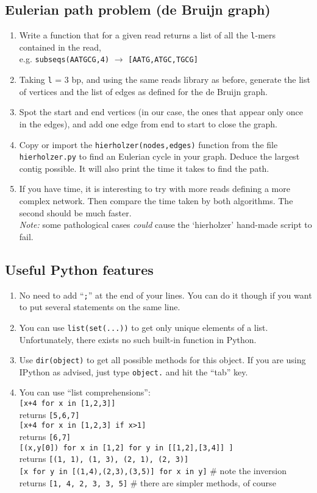 \documentclass[a4paper,11pt]{article}
\begin{document}
\subsection{Eulerian path problem (de Bruijn graph)}
\begin{enumerate}
\item Write a function that for a given read returns a list of all the \texttt{l}-mers contained in the read, \\
e.g. \texttt{subseqs(AATGCG,4)} $\rightarrow$  \texttt{[AATG,ATGC,TGCG]}
\item Taking \texttt{l} = 3 bp, and using the same reads library as before, generate the list of vertices and the list of edges as defined for the de Bruijn graph.
\item Spot the start and end vertices (in our case, the ones that appear only once in the edges), and add one edge from end to start to close the graph.
\item Copy or import the \texttt{hierholzer(nodes,edges)} function from the file \texttt{hierholzer.py} to find an Eulerian cycle in your graph. Deduce the largest contig possible. It will also print the time it takes to find the path.
\item If you have time, it is interesting to try with more reads defining a more complex network. Then compare the time taken by both algorithms. The second should be much faster.\\
\textit{Note:} some pathological cases \textit{could} cause the `hierholzer' hand-made script to fail.
\end{enumerate}


\subsection{Useful Python features}
\begin{enumerate}
\item No need to add ``\texttt{;}'' at the end of your lines. You can do it though if you want to put several statements on the same line.
\item You can use \texttt{list(set(...))} to get only unique elements of a list. Unfortunately, there exists no such built-in function in Python.
\item Use \texttt{dir(object)} to get all possible methods for this object. If you are using IPython as advised, just type \texttt{object.} and hit the ``tab'' key.
\item You can use ``list comprehensions'':\\
\texttt{[x+4 for x in [1,2,3]]} \\
returns \texttt{[5,6,7]} \\
\texttt{[x+4 for x in [1,2,3] if x>1]} \\
returns \texttt{[6,7]} \\
\texttt{[(x,y[0]) for x in [1,2] for y in [[1,2],[3,4]] ]}\\
returns \texttt{[(1, 1), (1, 3), (2, 1), (2, 3)]}\\
\texttt{[x for y in [(1,4),(2,3),(3,5)] for x in y]} \# note the inversion\\
returns \texttt{[1, 4, 2, 3, 3, 5]} \# there are simpler methods, of course\\
\end{enumerate}
\end{document}
